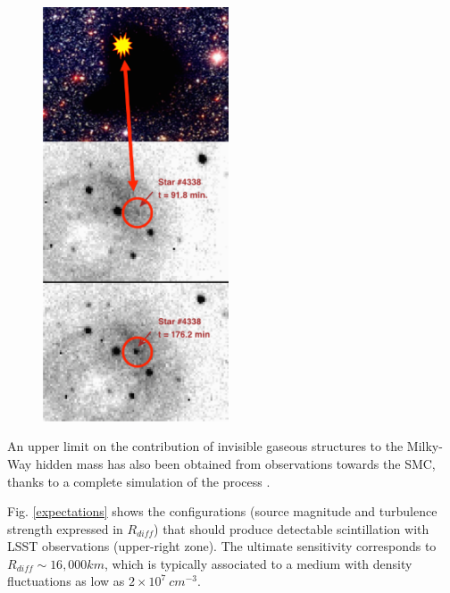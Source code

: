 \documentclass[11pt]{article}
\begin{document}
\begin{figure}[h!]
{\includegraphics[width=5.5cm]{candidat-scint.pdf}
\label{candidate}
}
\end{figure}
An upper limit on the contribution of
invisible gaseous structures to the Milky-Way hidden mass %
has also been obtained from observations towards the SMC, thanks to a complete simulation of the process \cite{simul}.

Fig. \ref{expectations} shows the configurations (source magnitude and
turbulence strength expressed in $R_{diff}$) that should produce
detectable scintillation with LSST observations (upper-right zone).
The ultimate sensitivity corresponds to $R_{diff} \sim 16,000 km$, which is typically associated to a medium
with density fluctuations as low as $2\times 10^7\ cm^{-3}$.
\end{document}
